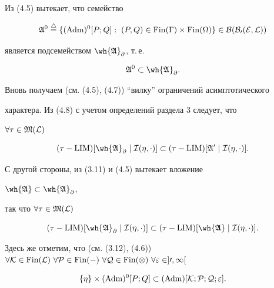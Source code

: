 Из (4.5) вытекает, что семейство


\begin{equation}


\frak A^0\overset{\triangle}{=}\{(\Adm)^0[P;Q]:\;(P,Q)\in


\Fin(\Gamma)\times \Fin(\Omega)\}\in\cal B(B_0(E,\cal L))


\end{equation}


является подсемейством $\wh{\frak A}_\partial$, т.\,е.


\begin{equation}


\frak A^0\subset\wh{\frak A}_\partial.


\end{equation}


Вновь получаем (см. (4.5), (4.7)) ``вилку'' ограничений асимптотического


характера. Из (4.8) с учетом определений раздела 3 следует, что


$\forall\tau\in\frak M(\cal L)$


\begin{equation}


(\tau-\LIM)[\wh{\frak A}_\partial\mid\cal I(\eta,


\cdot)]\subset(\tau-\LIM)[\frak A^0\mid\cal I(\eta,\cdot)].


\end{equation}


С другой стороны, из (3.11) и (4.5) вытекает вложение


$\wh{\frak A}\subset\wh{\frak A}_\partial$,


так что $\forall\tau\in\frak M(\cal L)$


\begin{equation}


(\tau-\LIM)[\wh{\frak A}_\partial\mid\cal I(\eta,


\cdot)]\subset(\tau-\LIM)[\wh{\frak A}\mid\cal I(\eta,\cdot)].


\end{equation}


Здесь же отметим, что (см. (3.12), (4.6)) $\forall\cal K\in


\Fin(\cal L)\ \forall P\in \Fin(\Gamma)\ \forall Q\in


\Fin(\Omega)\ \forall\varepsilon\in]0,\infty[$


\begin{equation}


\{\eta\}\times (\Adm)^0[P;Q]\subset(\Adm)[\cal K;


P;Q;\varepsilon].


\end{equation}


